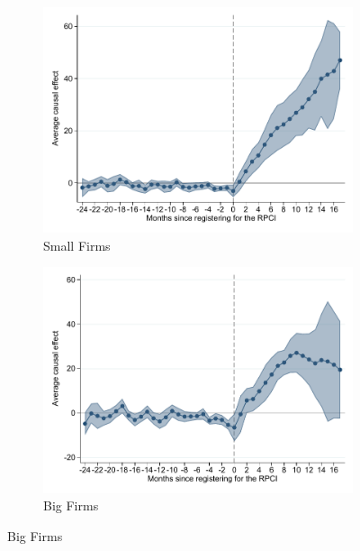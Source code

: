 \documentclass[oneside,11pt]{article}
\begin{document}
\begin{figure}[H]
\begin{center}
    \begin{subfigure}{0.49\textwidth}
    \caption{Small Firms}
    \includegraphics[width=\textwidth]{04_Figures/muestra_10porciento/event_study_sal_cierre_chaisemartin_pyme.pdf}
    \end{subfigure}
    \begin{subfigure}{0.49\textwidth}
    \caption{Big Firms}
    \includegraphics[width=\textwidth]{04_Figures/muestra_10porciento/event_study_sal_cierre_chaisemartin_emp_grande.pdf}
    \end{subfigure}
    
    \end{center}
\end{figure}
\end{document}
